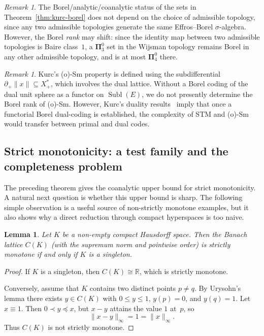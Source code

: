 \documentclass[12pt]{amsart}
\renewcommand{\le}{\leqslant}
\theoremstyle{plain}
\newtheorem{lemma}[theorem]{Lemma}
\theoremstyle{definition}
\theoremstyle{remark}
\newtheorem{remark}[theorem]{Remark}
\DeclareMathOperator{\Subl}{Subl}
\newcommand{\R}{\mathbb{R}}
\begin{document}
\begin{remark}\label{rem:kurc-topology-transfer}
The Borel/analytic/coanalytic status of the sets in
Theorem~\ref{thm:kurc-borel} does not depend on the choice of admissible
topology, since any two admissible topologies generate the same Effros--Borel
$\sigma$-algebra.  However, the Borel \emph{rank} may shift: since the
identity map between two admissible topologies is Baire class~$1$,
a $\boldsymbol{\Pi}^0_3$ set in the Wijsman topology remains Borel in any
other admissible topology, and is at most $\boldsymbol{\Pi}^0_4$ there.
\end{remark}

\begin{remark}\label{rem:kurc-dual}
Kurc's (o)-Sm property is defined using the subdifferential
$\partial_+\lVert x \rVert \subseteq X^*_+$, which involves the dual
lattice.  Without a Borel coding of the dual unit sphere as a functor on
$\Subl(E)$, we do not presently determine the Borel rank of (o)-Sm.  However,
Kurc's duality results~\cite{Kurc1993Dual} imply that once a functorial
Borel dual-coding is established, the complexity of STM and (o)-Sm would
transfer between primal and dual codes.
\end{remark}

\subsection{Strict monotonicity: a test family and the completeness problem}\label{subsec:STM-complete}

The preceding theorem gives the coanalytic upper bound for strict monotonicity.
A natural next question is whether this upper bound is sharp.  The following
simple observation is a useful source of non-strictly monotone examples, but it
also shows why a direct reduction through compact hyperspaces is too naive.

\begin{lemma}\label{lem:C(K)-STM}
Let $K$ be a non-empty compact Hausdorff space.  Then the Banach lattice $C(K)$
(with the supremum norm and pointwise order) is strictly monotone if and only if
$K$ is a singleton.
\end{lemma}

\begin{proof}
If $K$ is a singleton, then $C(K)\cong\R$, which is strictly monotone.

Conversely, assume that $K$ contains two distinct points $p\ne q$.  By
Urysohn's lemma there exists $y\in C(K)$ with $0\le y\le 1$, $y(p)=0$, and
$y(q)=1$.  Let $x\equiv 1$.  Then $0\prec y\preceq x$, but $x-y$ attains the
value $1$ at~$p$, so
\[
    \|x-y\|_\infty=1=\|x\|_\infty .
\]
Thus $C(K)$ is not strictly monotone.
\end{proof}
\end{document}
